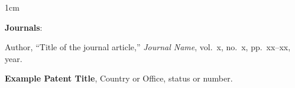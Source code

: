 \begin{publication}{1cm}



    \item[]\hspace{-\labelwidth}\hspace{-\labelsep}\textbf{Journals}:
    \item[1.] Author, ``Title of the journal article,'' \textit{Journal Name}, vol.~x, no.~x, pp.~xx--xx, year.




\end{publication}

\begin{cvpatents}
    \item \textbf{Example Patent Title}, Country or Office, status or number.
\end{cvpatents}
